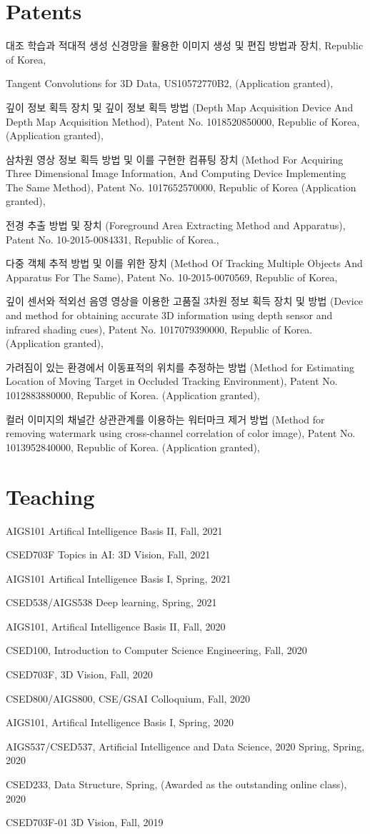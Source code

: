 \documentclass[letterpaper,11pt]{article}
\newcommand{\resumeItem}[1]{
  \small{
  \item{#1 \vspace{-2pt}}
  }
}
\newcommand{\resumeItemListStart}{\begin{itemize}}
\newcommand{\resumeItemListEnd}{\end{itemize}\vspace{-5pt}}
\begin{document}
\section{Patents}
\resumeItemListStart
    \resumeItem{대조 학습과 적대적 생성 신경망을 활용한 이미지 생성 및 편집 방법과 장치, Republic of Korea, }
    \resumeItem{Tangent Convolutions for 3D Data, US10572770B2, (Application granted), }
    \resumeItem{깊이 정보 획득 장치 및 깊이 정보 획득 방법 (Depth Map Acquisition Device And Depth Map Acquisition Method), Patent No. 1018520850000, Republic of Korea, (Application granted), }
    \resumeItem{삼차원 영상 정보 획득 방법 및 이를 구현한 컴퓨팅 장치 (Method For Acquiring Three Dimensional Image Information, And Computing Device Implementing The Same Method), Patent No. 1017652570000, Republic of Korea (Application granted), }
    \resumeItem{전경 추출 방법 및 장치 (Foreground Area Extracting Method and Apparatus), Patent No. 10-2015-0084331, Republic of Korea., }
    \resumeItem{다중 객체 추적 방법 및 이를 위한 장치 (Method Of Tracking Multiple Objects And Apparatus For The Same), Patent No. 10-2015-0070569, Republic of Korea, }
    \resumeItem{깊이 센서와 적외선 음영 영상을 이용한 고품질 3차원 정보 획득 장치 및 방법 (Device and method for obtaining accurate 3D information using depth sensor and infrared shading cues), Patent No. 1017079390000, Republic of Korea. (Application granted), }
    \resumeItem{가려짐이 있는 환경에서 이동표적의 위치를 추정하는 방법 (Method for Estimating Location of Moving Target in Occluded Tracking Environment), Patent No. 1012883880000, Republic of Korea. (Application granted), }
    \resumeItem{컬러 이미지의 채널간 상관관계를 이용하는 워터마크 제거 방법 (Method for removing watermark using cross-channel correlation of color image), Patent No. 1013952840000, Republic of Korea. (Application granted), }
\resumeItemListEnd



\section{Teaching}
\resumeItemListStart
    \resumeItem{AIGS101 Artifical Intelligence Basis II, Fall,  2021}
    \resumeItem{CSED703F Topics in AI: 3D Vision, Fall,  2021}
    \resumeItem{AIGS101 Artifical Intelligence Basis I, Spring,  2021}
    \resumeItem{CSED538/AIGS538 Deep learning, Spring,  2021}
    \resumeItem{AIGS101, Artifical Intelligence Basis II, Fall,  2020}
    \resumeItem{CSED100, Introduction to Computer Science Engineering, Fall,  2020}
    \resumeItem{CSED703F, 3D Vision, Fall,  2020}
    \resumeItem{CSED800/AIGS800, CSE/GSAI Colloquium, Fall,  2020}
    \resumeItem{AIGS101, Artifical Intelligence Basis I, Spring,  2020}
    \resumeItem{AIGS537/CSED537, Artificial Intelligence and Data Science, 2020 Spring, Spring,  2020}
    \resumeItem{CSED233, Data Structure, Spring, (Awarded as the outstanding online class),  2020}
    \resumeItem{CSED703F-01 3D Vision, Fall,  2019}
\resumeItemListEnd
\end{document}
